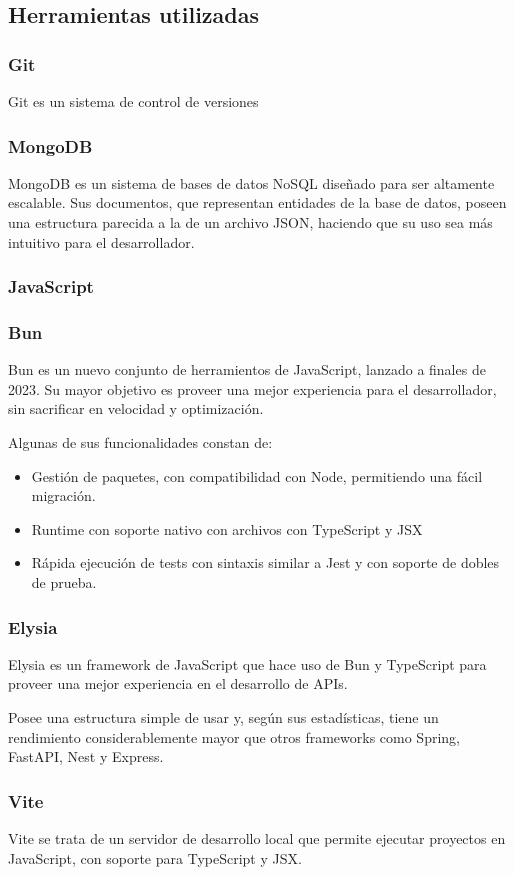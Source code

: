\subsection{Herramientas utilizadas}
\subsubsection{Git}
Git es un sistema de control de versiones
\subsubsection{MongoDB}
MongoDB es un sistema de bases de datos NoSQL diseñado para ser altamente escalable.
Sus documentos, que representan entidades de la base de datos, poseen una estructura
parecida a la de un archivo JSON, haciendo que su uso sea más intuitivo para el
desarrollador.
\subsubsection{JavaScript}
\subsubsection{Bun}
Bun es un nuevo conjunto de herramientos de JavaScript, lanzado a finales de 2023.
Su mayor objetivo es proveer una mejor experiencia para el desarrollador, sin sacrificar
en velocidad y optimización.

Algunas de sus funcionalidades constan de:
\begin{itemize}
  \item Gestión de paquetes, con compatibilidad con Node, permitiendo una fácil migración.
  \item Runtime con soporte nativo con archivos con TypeScript y JSX
  \item Rápida ejecución de tests con sintaxis similar a Jest y con soporte de dobles de prueba.
\end{itemize}
\subsubsection{Elysia}
Elysia es un framework de JavaScript que hace uso de Bun y TypeScript para proveer una mejor
experiencia en el desarrollo de APIs.

Posee una estructura simple de usar y, según sus estadísticas, tiene un rendimiento
considerablemente mayor que otros frameworks como Spring, FastAPI, Nest y Express.

\subsubsection{Vite}
Vite se trata de un servidor de desarrollo local que permite ejecutar proyectos
en JavaScript, con soporte para TypeScript y JSX.


